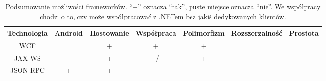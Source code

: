 \begin{table}[htbp]
	\centering
		\begin{tabular}{ | c || c | c | c | c | c | c |}
			\hline
				Technologia & Android & Hostowanie & Współpraca & Polimorfizm & Rozszerzalność & Prostota  \\
				\hline \hline
				WCF & & + & + & + & &\\
				\hline
				JAX-WS & & + & +/- & + & &\\
				\hline
				JSON-RPC & + & + & & & &\\
				\hline
		\end{tabular}
	\caption[Podsumowanie możliwości frameworków.]{Podsumowanie możliwości frameworków. ``+'' oznacza ``tak'', puste miejsce oznacza ``nie''. We współpracy chodzi o to, czy może współpracować z .NETem bez jakiś dedykowanych klientów.}
	\label{tab:frameworks-summary}
\end{table}
